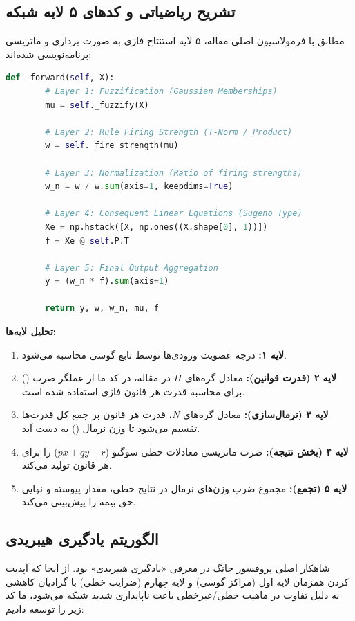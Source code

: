 \documentclass[12pt,a4paper]{article}
\begin{document}
\subsection{تشریح ریاضیاتی و کدهای ۵ لایه شبکه }
مطابق با فرمولاسیون اصلی مقاله، ۵ لایه استنتاج فازی به صورت برداری و ماتریسی برنامه‌نویسی شده‌اند:

\begin{latin}
	\begin{lstlisting}[language=Python,caption={ANFIS Forward Pass (5 Layers Implementation)}]
		def _forward(self, X):
		# Layer 1: Fuzzification (Gaussian Memberships)
		mu = self._fuzzify(X)
		
		# Layer 2: Rule Firing Strength (T-Norm / Product)
		w = self._fire_strength(mu)
		
		# Layer 3: Normalization (Ratio of firing strengths)
		w_n = w / w.sum(axis=1, keepdims=True)
		
		# Layer 4: Consequent Linear Equations (Sugeno Type)
		Xe = np.hstack([X, np.ones((X.shape[0], 1))])
		f = Xe @ self.P.T
		
		# Layer 5: Final Output Aggregation
		y = (w_n * f).sum(axis=1)
		
		return y, w, w_n, mu, f
	\end{lstlisting}
\end{latin}

\textbf{تحلیل لایه‌ها:}
\begin{enumerate}
	\item \textbf{لایه ۱:} درجه عضویت ورودی‌ها توسط تابع گوسی محاسبه می‌شود.
	\item \textbf{لایه ۲ (قدرت قوانین):} معادل گره‌های $\Pi$ در مقاله، در کد ما از عملگر ضرب () برای محاسبه قدرت هر قانون فازی استفاده شده است.
	\item \textbf{لایه ۳ (نرمال‌سازی):} معادل گره‌های $N$، قدرت هر قانون بر جمع کل قدرت‌ها تقسیم می‌شود تا وزن نرمال () به دست آید.
	\item \textbf{لایه ۴ (بخش نتیجه):} ضرب ماتریسی  معادلات خطی سوگنو ($p x + q y + r$) را برای هر قانون تولید می‌کند.
	\item \textbf{لایه ۵ (تجمع):} مجموع ضرب وزن‌های نرمال در نتایج خطی، مقدار پیوسته و نهایی حق بیمه را پیش‌بینی می‌کند.
\end{enumerate}

\subsection{الگوریتم یادگیری هیبریدی }
شاهکار اصلی پروفسور جانگ در معرفی «یادگیری هیبریدی» بود. از آنجا که آپدیت کردن همزمان لایه اول (مراکز گوسی) و لایه چهارم (ضرایب خطی) با گرادیان کاهشی به دلیل تفاوت در ماهیت خطی/غیرخطی باعث ناپایداری شدید شبکه می‌شود، ما کد زیر را توسعه دادیم:
\end{document}
